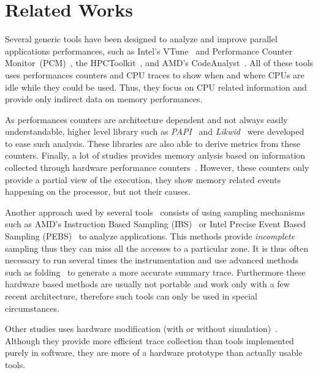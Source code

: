 
\section{Related Works}
\label{sec:related}

Several generic tools have been designed to analyze and improve parallel
applications performances, such as Intel's VTune~\cite{Reinders05VTune} and
Performance Counter Monitor~(PCM)~\cite{Intel2012b}, the
HPCToolkit~\cite{Adhianto10HPCTOOLKIT}, and AMD's
CodeAnalyst~\cite{Drongowski2008}. All of these tools uses performances
counters and CPU traces to show when and where CPUs are idle while they could
be used. Thus, they focus on CPU related information and provide only
indirect data on memory performances.

As performances counters are architecture dependent and not always easily
understandable, higher level library such as \emph{PAPI}~\cite{Weaver13PAPI} and
\emph{Likwid}~\cite{Treibig10LIKWID} were developed to ease such analysis. These
libraries are also able to derive metrics from these counters.  Finally, a lot of studies provides memory anlysis based
on information collected through hardware performance counters~\cite{Majo13(Mis)understanding,
Jiang14Understanding,Bosch00Rivet,Weyers14Visualization,Tao01Visualizing,DeRose01Hardware}.
However, these counters only provide a partial view of the execution, they
show memory related events happening on the processor, but not their causes.

Another approach used by several
tools~\cite{Lachaize12MemProf,McCurdy10Memphis,Liu14Tool,Gimenez14Dissecting}
consists of using sampling mechanisms such as AMD's Instruction Based Sampling
(IBS)~\cite{Drongowski07Instructionbased} or Intel Precise Event Based
Sampling (PEBS)~\cite{Levinthal2009} to analyze applications. This methods
provide \emph{incomplete} sampling thus they can miss all the accesses to a
particular zone. It is thus often necessary to run several times the
instrumentation and use advanced methods such as
folding~\cite{Servat15Towards} to generate a more accurate summary trace. Furthermore
these hardware based methods are usually not portable and work only with a few
recent architecture, therefore such tools can only be used in special
circumstances.

Other studies uses hardware modification (with or without
simulation)~\cite{Bao08HMTT,Martonosi92MemSpy}.  Although they provide more
efficient trace collection than tools implemented purely in software, they are
more of a hardware prototype than actually usable tools.

